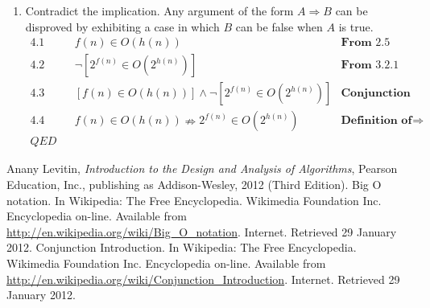 \documentclass{article}
\begin{document}
\begin{enumerate}
\begin{enumerate}

  \end{enumerate}
  \item Contradict the implication. Any argument of the form $A \Rightarrow B$ can be disproved by exhibiting a case in which $B$ can be false when $A$ is true.
  \[
  \begin{array}{lrlr}
    4.1 & & f(n) \in O(h(n)) & \textbf{From } 2.5 \\
    4.2 & & \neg[2^{f(n)} \in O(2^{h(n)})] & \textbf{From } 3.2.1 \\
    4.3 & & [f(n) \in O(h(n))] \wedge \neg[2^{f(n)} \in O(2^{h(n)})] & \textbf{Conjunction Introduction} \\
    4.4 & & f(n) \in O(h(n)) \nRightarrow 2^{f(n)} \in O(2^{h(n)}) & \textbf{Definition of } \Rightarrow \\
    QED
  \end{array}
  \]
\end{enumerate}

\begin{thebibliography}{9}
   Anany Levitin, \emph{Introduction to the Design and Analysis of Algorithms}, Pearson Education, Inc., publishing as Addison-Wesley, 2012 (Third Edition).
   Big O notation. In Wikipedia: The Free Encyclopedia. Wikimedia Foundation Inc. Encyclopedia on-line. Available from \url{http://en.wikipedia.org/wiki/Big_O_notation}. Internet. Retrieved 29 January 2012.
   Conjunction Introduction. In Wikipedia: The Free Encyclopedia. Wikimedia Foundation Inc. Encyclopedia on-line. Available from \url{http://en.wikipedia.org/wiki/Conjunction_Introduction}. Internet. Retrieved 29 January 2012.
\end{thebibliography}
\end{document}
